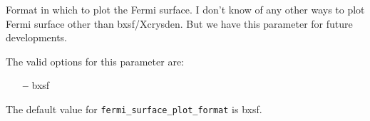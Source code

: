 Format in which to plot the Fermi surface. I don't know of any other ways
to plot Fermi surface other than bxsf/Xcrysden. But we have this
parameter for future developments. 

The valid options for this parameter are:
\begin{itemize}
\item[{\bf --}] bxsf
\end{itemize}

The default value for \verb#fermi_surface_plot_format# is bxsf.


%




%
%
%
%
%
%
%
%
%
%
%
%




